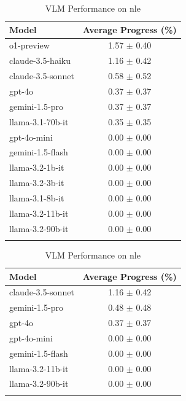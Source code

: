 \begin{table}[h]
    \centering
    \begin{minipage}[t]{0.48\linewidth}
    \centering
    \caption{LLM Performance on nle}
    \begin{tabular}{lc}
    \hline
    Model & Average Progress (\%) \\
    \hline
    o1-preview & 1.57 $\pm$ 0.40 \\
    claude-3.5-haiku & 1.16 $\pm$ 0.42 \\
    claude-3.5-sonnet & 0.58 $\pm$ 0.52 \\
    gpt-4o & 0.37 $\pm$ 0.37 \\
    gemini-1.5-pro & 0.37 $\pm$ 0.37 \\
    llama-3.1-70b-it & 0.35 $\pm$ 0.35 \\
    gpt-4o-mini & 0.00 $\pm$ 0.00 \\
    gemini-1.5-flash & 0.00 $\pm$ 0.00 \\
    llama-3.2-1b-it & 0.00 $\pm$ 0.00 \\
    llama-3.2-3b-it & 0.00 $\pm$ 0.00 \\
    llama-3.1-8b-it & 0.00 $\pm$ 0.00 \\
    llama-3.2-11b-it & 0.00 $\pm$ 0.00 \\
    llama-3.2-90b-it & 0.00 $\pm$ 0.00 \\
    \hline
    \label{LLM_NLE}
    \end{tabular}
    \end{minipage}
    \hfill
    \begin{minipage}[t]{0.48\linewidth}
    \centering
    \caption{VLM Performance on nle}
    \begin{tabular}{lc}
    \hline
    Model & Average Progress (\%) \\
    \hline
    claude-3.5-sonnet & 1.16 $\pm$ 0.42 \\
    gemini-1.5-pro & 0.48 $\pm$ 0.48 \\
    gpt-4o & 0.37 $\pm$ 0.37 \\
    gpt-4o-mini & 0.00 $\pm$ 0.00 \\
    gemini-1.5-flash & 0.00 $\pm$ 0.00 \\
    llama-3.2-11b-it & 0.00 $\pm$ 0.00 \\
    llama-3.2-90b-it & 0.00 $\pm$ 0.00 \\
    \hline
    \label{VLM_NLE}
    \end{tabular}
    \end{minipage}
\end{table}




